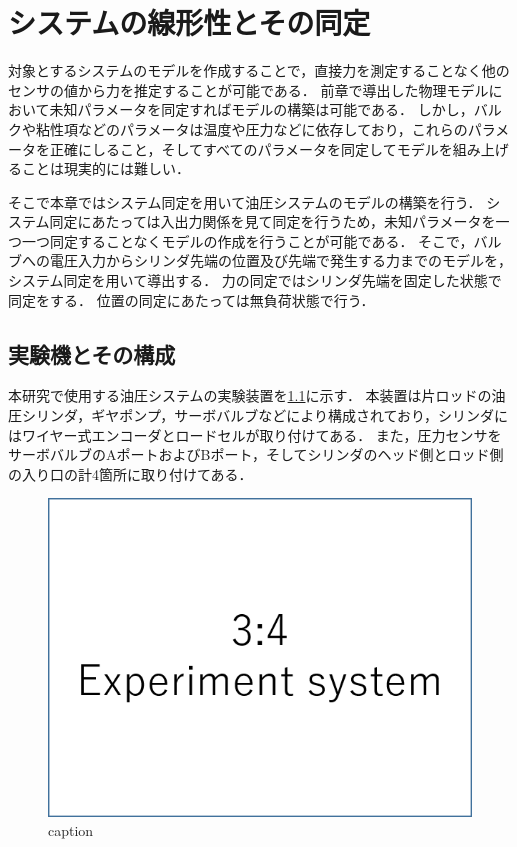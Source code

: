 \chapter{システムの線形性とその同定}
対象とするシステムのモデルを作成することで，直接力を測定することなく他のセンサの値から力を推定することが可能である．
前章で導出した物理モデルにおいて未知パラメータを同定すればモデルの構築は可能である．
しかし，バルクや粘性項などのパラメータは温度や圧力などに依存しており，これらのパラメータを正確にしること，そしてすべてのパラメータを同定してモデルを組み上げることは現実的には難しい．

そこで本章ではシステム同定を用いて油圧システムのモデルの構築を行う．
システム同定にあたっては入出力関係を見て同定を行うため，未知パラメータを一つ一つ同定することなくモデルの作成を行うことが可能である．
そこで，バルブへの電圧入力からシリンダ先端の位置及び先端で発生する力までのモデルを，システム同定を用いて導出する．
力の同定ではシリンダ先端を固定した状態で同定をする．
位置の同定にあたっては無負荷状態で行う．
\section{実験機とその構成}
本研究で使用する油圧システムの実験装置を\figname\ref{fig:ExperimentSystem}に示す．
本装置は片ロッドの油圧シリンダ，ギヤポンプ，サーボバルブなどにより構成されており，シリンダにはワイヤー式エンコーダとロードセルが取り付けてある．
また，圧力センサをサーボバルブのAポートおよびBポート，そしてシリンダのヘッド側とロッド側の入り口の計4箇所に取り付けてある．
\begin{figure}[t]
    \centering
        \includegraphics[keepaspectratio, scale=1.0]{contents/SystemIdentification/figure/3-4ExperimentSystem.png}
        \caption{caption}
        \label{fig:ExperimentSystem}
\end{figure}

